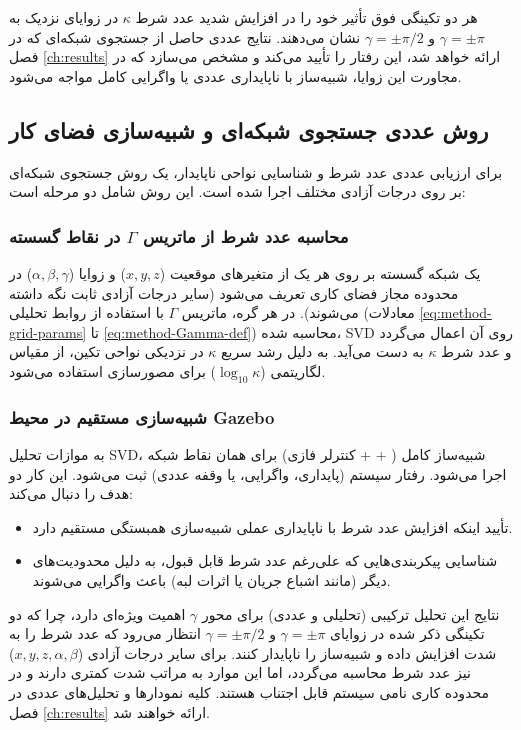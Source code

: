 هر دو تکینگی فوق تأثیر خود را در افزایش شدید عدد شرط $\kappa$ در زوایای نزدیک به $\gamma = \pm\pi$ و $\gamma = \pm\pi/2$ نشان می‌دهند. نتایج عددی حاصل از جستجوی شبکه‌ای که در فصل \ref{ch:results} ارائه خواهد شد، این رفتار را تأیید می‌کند و مشخص می‌سازد که در مجاورت این زوایا، شبیه‌ساز با ناپایداری عددی یا واگرایی کامل مواجه می‌شود.

\subsection{روش عددی جستجوی شبکه‌ای و شبیه‌سازی فضای کار}
\label{subsec:method-grid-search}

برای ارزیابی عددی عدد شرط و شناسایی نواحی ناپایدار، یک روش جستجوی شبکه‌ای بر روی درجات آزادی مختلف اجرا شده است. این روش شامل دو مرحله است:

\subsubsection{محاسبه عدد شرط از ماتریس $\Gamma$ در نقاط گسسته}
\label{subsubsec:method-svd-grid}
یک شبکه گسسته بر روی هر یک از متغیرهای موقعیت ($x, y, z$) و زوایا ($\alpha, \beta, \gamma$) در محدوده مجاز فضای کاری تعریف می‌شود (سایر درجات آزادی ثابت نگه داشته می‌شوند). در هر گره، ماتریس $\Gamma$ با استفاده از روابط تحلیلی (معادلات \ref{eq:method-grid-params} تا \ref{eq:method-Gamma-def}) محاسبه شده، SVD روی آن اعمال می‌گردد و عدد شرط $\kappa$ به دست می‌آید. به دلیل رشد سریع $\kappa$ در نزدیکی نواحی تکین، از مقیاس لگاریتمی ($\log_{10} \kappa$) برای مصورسازی استفاده می‌شود.

\subsubsection{شبیه‌سازی مستقیم در محیط Gazebo}
\label{subsubsec:method-gazebo-sim}
به موازات تحلیل SVD، شبیه‌ساز کامل ( +  + کنترلر فازی) برای همان نقاط شبکه اجرا می‌شود. رفتار سیستم (پایداری، واگرایی، یا وقفه عددی) ثبت می‌شود. این کار دو هدف را دنبال می‌کند:
\begin{itemize}
	\item تأیید اینکه افزایش عدد شرط با ناپایداری عملی شبیه‌سازی همبستگی مستقیم دارد.
	\item شناسایی پیکربندی‌هایی که علی‌رغم عدد شرط قابل قبول، به دلیل محدودیت‌های دیگر (مانند اشباع جریان یا اثرات لبه) باعث واگرایی می‌شوند.
\end{itemize}

نتایج این تحلیل ترکیبی (تحلیلی و عددی) برای محور $\gamma$ اهمیت ویژه‌ای دارد، چرا که دو تکینگی ذکر شده در زوایای $\gamma = \pm\pi$ و $\gamma = \pm\pi/2$ انتظار می‌رود که عدد شرط را به شدت افزایش داده و شبیه‌ساز را ناپایدار کنند. برای سایر درجات آزادی ($x,y,z,\alpha,\beta$) نیز عدد شرط محاسبه می‌گردد، اما این موارد به مراتب شدت کمتری دارند و در محدوده کاری نامی سیستم قابل اجتناب هستند. کلیه نمودارها و تحلیل‌های عددی در فصل \ref{ch:results} ارائه خواهند شد.